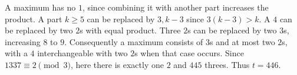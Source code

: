 A maximum has no $1$, since combining it with another part increases the product. A part $k\ge5$ can be replaced by $3,k-3$ since $3(k-3)>k$. A $4$ can be replaced by two $2$s with equal product. Three $2$s can be replaced by two $3$s, increasing $8$ to $9$. Consequently a maximum consists of $3$s and at most two $2$s, with a $4$ interchangeable with two $2$s when that case occurs. Since $1337\equiv2\pmod3$, here there is exactly one $2$ and $445$ threes. Thus $\boxed{t=446}$.
